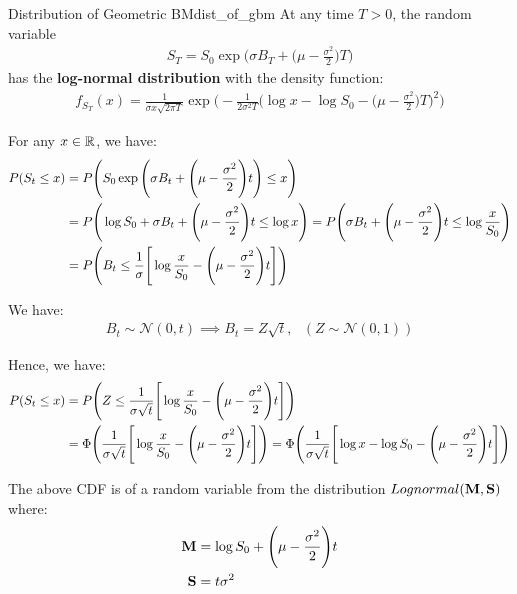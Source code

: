 \begin{proposition}{Distribution of Geometric BM}{dist_of_gbm}
    At any time $T > 0$, the random variable 
    \begin{align*}
        S_T = S_0 \exp\Bigg( \sigma B_T + \Bigg( \mu - \frac{\sigma^2}{2} \Bigg)T \Bigg)
    \end{align*}
    \noindent has the \textbf{log-normal distribution} with the density function:
    \begin{align*}
        \boxed{
            f_{S_T}(x) = \frac{1}{\sigma x \sqrt{2\pi T}}\exp\Bigg( 
                -\frac{1}{2\sigma^2 T} \Bigg(\log x - \log S_0 - \Bigg( \mu - \frac{\sigma^2}{2} \Bigg)T \Bigg)^2
            \Bigg)
        }
    \end{align*}
\end{proposition}

\begin{proof*}
    For any $x\in\mathbb{R}$, we have:
    \begin{align*}
        P(S_t \le x) &= P\Bigg( 
            S_0 \exp\Bigg( 
                \sigma B_t + \Bigg( \mu - \frac{\sigma^2}{2} \Bigg)t
             \Bigg) \le x
         \Bigg) \\
        &= P\Bigg( 
            \log S_0 + \sigma B_t + \Bigg(  \mu - \frac{\sigma^2}{2}  \Bigg)t  \le \log x
         \Bigg) = P\Bigg( 
            \sigma B_t + \Bigg(  \mu - \frac{\sigma^2}{2}  \Bigg)t \le \log \frac{x}{S_0}
         \Bigg)\\
        &= P\Bigg( 
            B_t \le \frac{1}{\sigma} \Bigg[ 
                \log\frac{x}{S_0} - \Bigg(  \mu - \frac{\sigma^2}{2}  \Bigg)t
             \Bigg]
         \Bigg)
    \end{align*}

    \noindent We have:
    \begin{align*}
        B_t \sim \mathcal{N}(0,t) \implies B_t = Z\sqrt{t}, \ \ \ (Z\sim \mathcal{N}(0,1))
    \end{align*}

    \noindent Hence, we have:
    \begin{align*}
        P(S_t \le x) 
            &= P\Bigg( 
                    Z \le \frac{1}{\sigma\sqrt{t}} \Bigg[ 
                    \log\frac{x}{S_0} - \Bigg(  \mu - \frac{\sigma^2}{2}  \Bigg)t
                 \Bigg]
             \Bigg) \\
            &= \Phi \Bigg( 
                \frac{1}{\sigma\sqrt{t}} \Bigg[ 
                    \log\frac{x}{S_0} - \Bigg(  \mu - \frac{\sigma^2}{2}  \Bigg)t
                 \Bigg]
             \Bigg) = \Phi \Bigg( 
                \frac{1}{\sigma\sqrt{t}} \Bigg[ 
                    \log x - \log S_0 - \Bigg(  \mu - \frac{\sigma^2}{2}  \Bigg)t
                 \Bigg]
             \Bigg)
    \end{align*}

    \noindent The above CDF is of a random variable from the distribution $Lognormal({\bf M, S})$ where:
    \begin{align*}
        {\bf M} &= \log S_0 + \Bigg(  \mu - \frac{\sigma^2}{2}  \Bigg)t \\
        {\bf S} &= t\sigma^2
    \end{align*}
\end{proof*}


